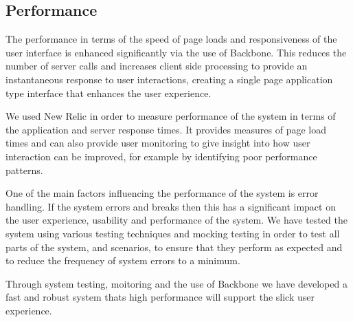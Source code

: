 \subsection{Performance}
The performance in terms of the speed of page loads and responsiveness of the user interface is enhanced significantly via the use of Backbone. This reduces the number of server calls and increases client side processing to provide an instantaneous response to user interactions, creating a single page application type interface that enhances the user experience. 

We used New Relic in order to measure performance of the system in terms of the application and server response times. It provides measures of page load times and can also provide user monitoring to give insight into how user interaction can be improved, for example by identifying poor performance patterns.

One of the main factors influencing the performance of the system is error handling. If the system errors and breaks then this has a significant impact on the user experience, usability and performance of the system. We have tested the system using various testing techniques and mocking testing in order to test all parts of the system, and scenarios, to ensure that they perform as expected and to reduce the frequency of system errors to a minimum.

Through system testing, moitoring and the use of Backbone we have developed a fast and robust system thats high performance will support the slick user experience.